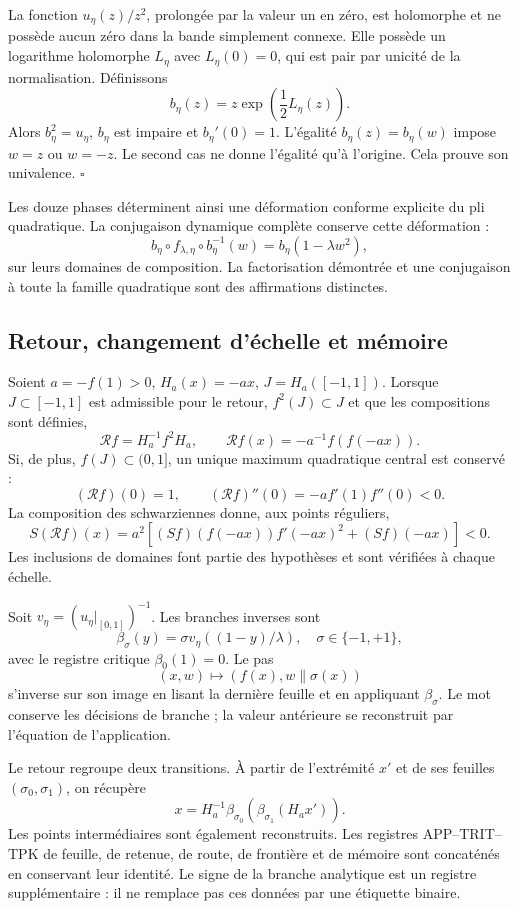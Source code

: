 La fonction \(u_\eta(z)/z^2\), prolongée par la valeur un en zéro, est holomorphe et ne possède aucun zéro dans la bande simplement connexe. Elle possède un logarithme holomorphe \(L_\eta\) avec \(L_\eta(0)=0\), qui est pair par unicité de la normalisation. Définissons
\[
b_\eta(z)=z\exp\!\left(\frac12L_\eta(z)\right).
\]
Alors \(b_\eta^2=u_\eta\), \(b_\eta\) est impaire et \(b_\eta'(0)=1\). L’égalité \(b_\eta(z)=b_\eta(w)\) impose \(w=z\) ou \(w=-z\). Le second cas ne donne l’égalité qu’à l’origine. Cela prouve son univalence. \(\square\)

Les douze phases déterminent ainsi une déformation conforme explicite du pli quadratique. La conjugaison dynamique complète conserve cette déformation :
\[
b_\eta\circ f_{\lambda,\eta}\circ b_\eta^{-1}(w)
=b_\eta(1-\lambda w^2),
\]
sur leurs domaines de composition. La factorisation démontrée et une conjugaison à toute la famille quadratique sont des affirmations distinctes.


\subsection{Retour, changement d’échelle et mémoire}
\label{hmtfg:desarrollo:5}

Soient \(a=-f(1)>0\), \(H_a(x)=-ax\), \(J=H_a([-1,1])\). Lorsque \(J\subset[-1,1]\) est admissible pour le retour, \(f^2(J)\subset J\) et que les compositions sont définies,
\[
\mathcal Rf=H_a^{-1}f^2H_a,\qquad
\mathcal Rf(x)=-a^{-1}f(f(-ax)).
\]
Si, de plus, \(f(J)\subset(0,1]\), un unique maximum quadratique central est conservé :
\[
(\mathcal Rf)(0)=1,\qquad
(\mathcal Rf)''(0)=-a f'(1)f''(0)<0.
\]
La composition des schwarziennes donne, aux points réguliers,
\[
S(\mathcal Rf)(x)=a^2
\left[(Sf)(f(-ax))f'(-ax)^2+(Sf)(-ax)\right]<0.
\]
Les inclusions de domaines font partie des hypothèses et sont vérifiées à chaque échelle.

Soit \(v_\eta=(u_\eta|_{[0,1]})^{-1}\). Les branches inverses sont
\[
\beta_\sigma(y)=\sigma v_\eta((1-y)/\lambda),\quad
\sigma\in\{-1,+1\},
\]
avec le registre critique \(\beta_0(1)=0\). Le pas
\[
(x,w)\longmapsto(f(x),w\mathbin{\|}\sigma(x))
\]
s’inverse sur son image en lisant la dernière feuille et en appliquant \(\beta_\sigma\). Le mot conserve les décisions de branche ; la valeur antérieure se reconstruit par l’équation de l’application.

Le retour regroupe deux transitions. À partir de l’extrémité \(x'\) et de ses feuilles \((\sigma_0,\sigma_1)\), on récupère
\[
x=H_a^{-1}\beta_{\sigma_0}
\!\left(\beta_{\sigma_1}(H_ax')\right).
\]
Les points intermédiaires sont également reconstruits. Les registres APP–TRIT–TPK de feuille, de retenue, de route, de frontière et de mémoire sont concaténés en conservant leur identité. Le signe de la branche analytique est un registre supplémentaire : il ne remplace pas ces données par une étiquette binaire.

